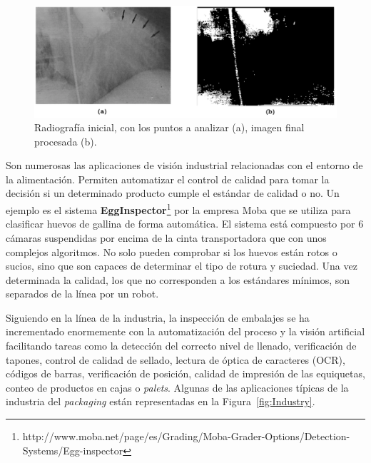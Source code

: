 \begin{figure}[th]
\centering
\includegraphics[scale=0.4]{Figures/medicine.png}
\decoRule
\caption[Aplicaciones de radiografía en medicina]{Radiografía inicial, con los puntos a analizar (a), imagen final procesada (b).}
\label{fig:Medicine}
\end{figure}

Son numerosas las aplicaciones de visión industrial relacionadas con el entorno de la alimentación. Permiten automatizar el control de calidad para tomar la decisión si un determinado producto cumple el estándar de calidad o no. Un ejemplo es el sistema \textbf{EggInspector}\footnote{http://www.moba.net/page/es/Grading/Moba-Grader-Options/Detection-Systems/Egg-inspector} por la empresa Moba que se utiliza para clasificar huevos de gallina de forma automática. El sistema está compuesto por 6 cámaras suspendidas por encima de la cinta transportadora que con unos complejos algoritmos. No solo pueden comprobar si los huevos están rotos o sucios, sino que son capaces de determinar el tipo de rotura y suciedad. Una vez determinada la calidad, los que no corresponden a los estándares mínimos, son separados de la línea por un robot.

Siguiendo en la línea de la industria, la inspección de embalajes se ha incrementado enormemente con la automatización del proceso y la visión artificial facilitando tareas como la detección del correcto nivel de llenado, verificación de tapones, control de calidad de sellado, lectura de óptica de caracteres (OCR), códigos de barras, verificación de posición, calidad de impresión de las equiquetas, conteo de productos en cajas o \textit{palets}. Algunas de las aplicaciones típicas de la industria del \textit{packaging} están representadas en la Figura~\ref{fig:Industry}.

